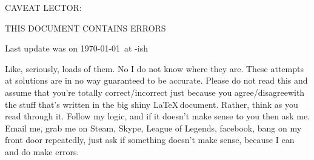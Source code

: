\documentclass{article}
\begin{document}
\newcommand{\nl}{\mbox{}\\} %
\newcommand{\altx}{\:|\:} %
\newcommand{\alty}{\\[0.1cm]&\:|\:&} %
\newcommand{\minus}{\mbox{-}} %
\newcommand{\term}[1]{\,\mbox{\tt #1}\,} %
\newcommand{\nat}{\rightsquigarrow} %
\newcommand{\axm}[4]{\item[{\sc #1 :
}]\begin{tabular}{cc}#2\\\hline#3\\\end{tabular}\quad#4}
\newcommand{\sem}[1]{[\![#1]\!]}
\newcommand{\lam}[2]{\lambda {#1} \,.\, #2}
\newcommand{\lfp}[1]{lfp\,(\,#1\,)}
\newcommand{\fix}[1]{fix\,(\,#1\,)}
\newcommand{\hoarep}[3]{\{#1\}\,#2\,\{#3\}}
\newcommand{\hoareP}[3]{\left\{\begin{array}{c}#1\end{array}\right\}\,#2\,\newline\left\{\begin{array}{c}#3\end{array}\right\}}
\newcommand{\hoaret}[3]{[#1]\,#2\,[#3]}
\newcommand{\hoareT}[3]{\left[\begin{array}{c}#1\end{array}\right]\,#2\,\left[\begin{array}{c}#3\end{array}\right]}
\newcommand{\assume}[1]{$\blacklozenge$ #1}
\newcommand{\st}{\,\; st \,\;}
\newcommand{\pr}{\mathbb{P}}


\begin{center}
	\Huge{CAVEAT LECTOR:}
\end{center}
\begin{center}
	\Large{THIS DOCUMENT CONTAINS ERRORS}
\end{center}
\begin{center}
Last update was on \today \, at \currenttime-ish
\end{center}

Like, seriously, loads of them. No I do not know where they are. These attempts
at solutions are in no way guaranteed to be accurate. Please do not read this
and assume that you're totally correct/incorrect just because you
agree/disagreewith the stuff that's written in the big shiny \LaTeX \,document.
Rather, think as you read through it. Follow my logic, and if it doesn't make
 sense to you then ask me. Email me\footnotemark[1], grab me on Steam, Skype, League of
 Legends\footnotemark[2], facebook, bang on my
 front door repeatedly\footnotemark[3], just ask if something doesn't make sense, because I
can and do make errors.
\end{document}
